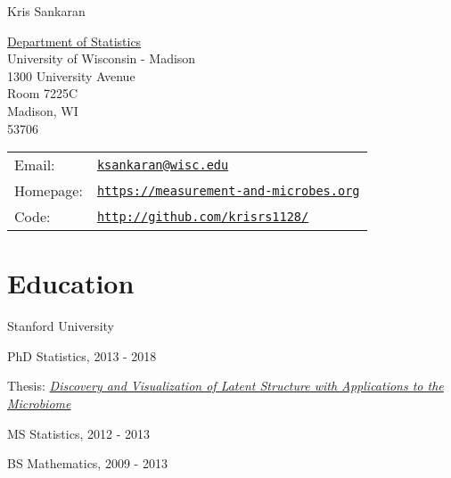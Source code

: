 \documentclass[letterpaper]{article}
\def\name{Kris Sankaran}
\renewenvironment{itemize}{
  \begin{list}{}{
    \setlength{\leftmargin}{1.5em}
  }
}{
  \end{list}
}
\begin{document}
{\huge \name}


\vspace{0.25in}

\begin{minipage}{0.45\linewidth}
  \href{https://stat.wisc.edu/}{Department of Statistics} \\
  University of Wisconsin - Madison \\
  1300 University Avenue \\
  Room 7225C \\
  Madison, WI \\
  53706
\end{minipage}
\begin{minipage}{0.45\linewidth}
  \begin{tabular}{ll}
    Email: & \href{mailto:ksankaran@wisc.edu}{\tt ksankaran@wisc.edu} \\
    Homepage: & \href{https://measurement-and-microbes.org}{\tt https://measurement-and-microbes.org} \\
    Code: & \href{http://github.com/krisrs1128/}{\tt http://github.com/krisrs1128/} \\
  \end{tabular}
\end{minipage}

\section*{Education}
Stanford University
\begin{itemize}
  \item PhD Statistics, 2013 - 2018
    \begin{itemize}
    \item Thesis: \textit{\href{https://searchworks.stanford.edu/view/12375828}{Discovery and Visualization of Latent Structure with Applications to the Microbiome}}
    \end{itemize}
  \item MS Statistics, 2012 - 2013
  \item BS Mathematics, 2009 - 2013
\end{itemize}
\end{document}
